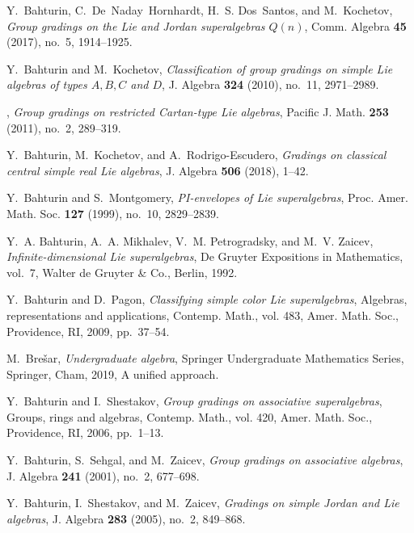 \documentclass[12pt]{pdfathesis}
\begin{document}
\begin{thebibliography}{BHDSK17}
Y.~Bahturin, C.~De~Naday~Hornhardt, H.~S. Dos~Santos, and M.~Kochetov, \emph{Group
  gradings on the {L}ie and {J}ordan superalgebras {$Q(n)$}}, Comm. Algebra
  \textbf{45} (2017), no.~5, 1914--1925. 

Y.~Bahturin and M.~Kochetov, \emph{Classification of group gradings on simple
  {L}ie algebras of types {$A,B,C$} and {$D$}}, J. Algebra \textbf{324} (2010),
  no.~11, 2971--2989. 

\bysame, \emph{Group gradings on restricted {C}artan-type {L}ie algebras},
  Pacific J. Math. \textbf{253} (2011), no.~2, 289--319. 

Y.~Bahturin, M.~Kochetov, and A.~Rodrigo{-}Escudero, \emph{Gradings on
  classical central simple real {L}ie algebras}, J. Algebra \textbf{506}
  (2018), 1--42. 

Y.~Bahturin and S.~Montgomery, \emph{P{I}-envelopes of {L}ie superalgebras},
  Proc. Amer. Math. Soc. \textbf{127} (1999), no.~10, 2829--2839. 

Y.~A. Bahturin, A.~A. Mikhalev, V.~M. Petrogradsky, and M.~V. Zaicev,
  \emph{Infinite-dimensional {L}ie superalgebras}, De Gruyter Expositions in
  Mathematics, vol.~7, Walter de Gruyter \& Co., Berlin, 1992. 

Y.~Bahturin and D.~Pagon, \emph{Classifying simple color {L}ie superalgebras},
  Algebras, representations and applications, Contemp. Math., vol. 483, Amer.
  Math. Soc., Providence, RI, 2009, pp.~37--54. 

M.~Bre\v{s}ar, \emph{Undergraduate algebra}, Springer Undergraduate Mathematics
  Series, Springer, Cham, 2019, A unified approach. 

Y.~Bahturin and I.~Shestakov, \emph{Group gradings on associative
  superalgebras}, Groups, rings and algebras, Contemp. Math., vol. 420, Amer.
  Math. Soc., Providence, RI, 2006, pp.~1--13. 

Y.~Bahturin, S.~Sehgal, and M.~Zaicev, \emph{Group gradings on associative
  algebras}, J. Algebra \textbf{241} (2001), no.~2, 677--698. 

Y.~Bahturin, I.~Shestakov, and M.~Zaicev, \emph{Gradings on simple {J}ordan and
  {L}ie algebras}, J. Algebra \textbf{283} (2005), no.~2, 849--868.


\end{thebibliography}
\end{document}
